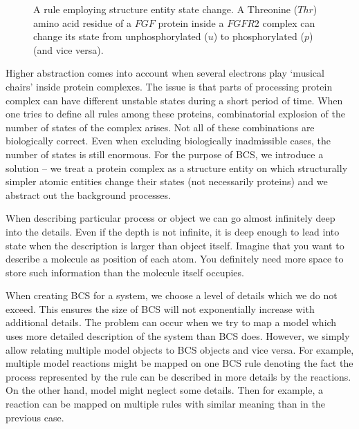 \documentclass[12pt, twoside]{fithesis2} %
\begin{document}
\begin{figure}[!h]
\begin{center}
\end{center}
\caption{A rule employing structure entity state change. A Threonine ($Thr$) amino acid residue of a $FGF$ protein inside a $FGFR2$ complex can change its state from unphosphorylated ($u$) to phosphorylated ($p$) (and vice versa).}\label{rule_example}
\end{figure}

Higher abstraction comes into account when several electrons play `musical chairs' inside protein complexes. The issue is that parts of processing protein complex can have different unstable states during a short period of time. When one tries to define all rules among these proteins, combinatorial explosion of the number of states of the complex arises. Not all of these combinations are biologically correct. Even when excluding biologically inadmissible cases, the number of states is still enormous. For the purpose of BCS, we introduce a solution -- we treat a protein complex as a structure entity on which structurally simpler atomic entities change their states (not necessarily proteins) and we abstract out the background processes.

When describing particular process or object we can go almost infinitely deep into the details. Even if the depth is not infinite, it is deep enough to lead into state when the description is larger than object itself. Imagine that you want to describe a molecule as position of each atom. You definitely need more space to store such information than the molecule itself occupies.

When creating BCS for a system, we choose a level of details which we do not exceed. This ensures the size of BCS will not exponentially increase with additional details. The problem can occur when we try to map a model which uses more detailed description of the system than BCS does. However, we simply allow relating multiple model objects to BCS objects and vice versa. For example, multiple model reactions might be mapped on one BCS rule denoting the fact the process represented by the rule can be described in more details by the reactions. On the other hand, model might neglect some details. Then for example, a reaction can be mapped on multiple rules with similar meaning than in the previous case.
\end{document}
